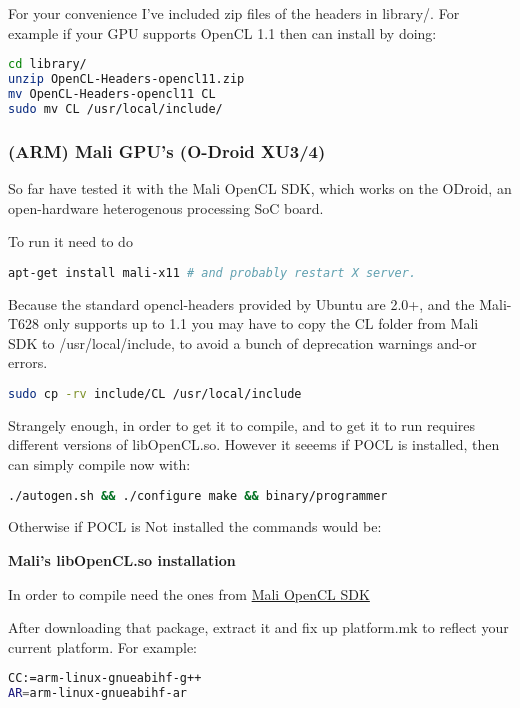 \documentclass[12pt]{report}
\begin{document}
For your convenience I've included zip files of the headers in library/.
For example if your GPU supports OpenCL 1.1 then can install by doing:
\begin{lstlisting}[language=bash]
cd library/
unzip OpenCL-Headers-opencl11.zip 
mv OpenCL-Headers-opencl11 CL
sudo mv CL /usr/local/include/
\end{lstlisting}


\subsubsection{(ARM) Mali GPU's (O-Droid XU3/4)}

So far have tested it with the Mali OpenCL SDK, which works on the ODroid, an
open-hardware heterogenous processing SoC board.


To run it need to do
\begin{lstlisting}[language=bash]
apt-get install mali-x11 # and probably restart X server.
\end{lstlisting}


Because the standard opencl-headers provided by Ubuntu are 2.0+, and the
Mali-T628 only supports up to 1.1 you may have to copy the CL folder 
from Mali SDK to /usr/local/include, to avoid a bunch of deprecation
warnings and-or errors.
\begin{lstlisting}[language=bash]
sudo cp -rv include/CL /usr/local/include
\end{lstlisting}

Strangely enough, in order to get it to compile, and to get it to run requires
different versions of libOpenCL.so. However it seeems if POCL is installed, then
can simply compile now with:

\begin{lstlisting}[language=bash]
./autogen.sh && ./configure make && binary/programmer
\end{lstlisting}

Otherwise if POCL is Not installed the commands would be:

\textbf{Mali's libOpenCL.so installation}

In order to compile need the ones from
\href{https://developer.arm.com/products/software/mali-sdks/mali-opencl-sdk/downloads}
{Mali OpenCL SDK}

After downloading that package, extract it and fix up platform.mk to reflect
your current platform. For example:
\begin{lstlisting}[language=bash]
CC:=arm-linux-gnueabihf-g++
AR=arm-linux-gnueabihf-ar
\end{lstlisting}
\end{document}
